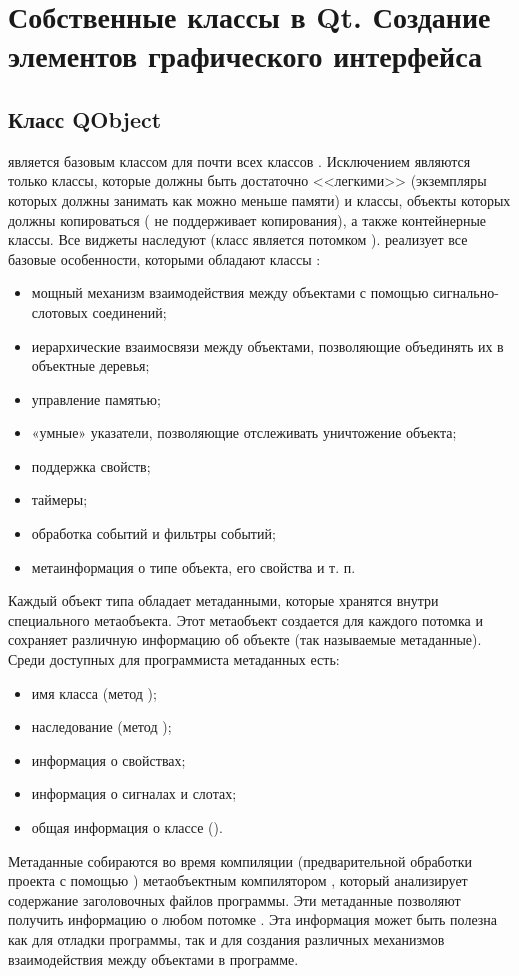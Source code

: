 \chapter[Создание элементов графического интерфейса]{Собственные классы в Qt.
Создание элементов графического интерфейса}
\section[Класс QObject]{Класс QObject}
 является базовым классом для почти всех классов . Исключением являются только
классы, которые должны быть достаточно <<легкими>> (экземпляры которых должны занимать как можно меньше
памяти) и классы, объекты которых должны копироваться ( не поддерживает копирования), а также
контейнерные классы. Все виджеты  наследуют  (класс  является потомком
).  реализует все базовые особенности, которыми обладают классы :

\begin{itemize}
\item мощный механизм взаимодействия между объектами с помощью сигнально-слотовых соединений;
\item иерархические взаимосвязи между объектами, позволяющие объединять их в объектные деревья;
\item управление памятью;
\item «умные» указатели, позволяющие отслеживать уничтожение объекта;
\item поддержка свойств;
\item таймеры;
\item обработка событий и фильтры событий;
\item метаинформация о типе объекта, его свойства и т. п.
\end{itemize}
Каждый объект типа  обладает метаданными, которые хранятся внутри специального
метаобъекта. Этот метаобъект создается для каждого потомка  и сохраняет
различную информацию об объекте (так называемые метаданные). Среди доступных для программиста метаданных есть:

\begin{itemize}
\item имя класса (метод );
\item наследование (метод );
\item информация о свойствах;
\item информация о сигналах и слотах;
\item общая информация о классе ().
\end{itemize}
Метаданные собираются во время компиляции (предварительной обработки проекта с помощью )
метаобъектным компилятором , который анализирует содержание заголовочных файлов программы. Эти метаданные
позволяют получить информацию о любом потомке . Эта информация может быть полезна как для отладки
программы, так и для создания различных механизмов взаимодействия между объектами в программе.

